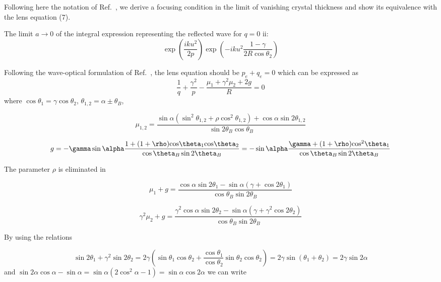\documentclass{iucr}              %
\begin{document}
Following here the notation of Ref.~\cite{GuigayFerrero2016}, we derive a focusing condition in the limit of vanishing crystal thickness and show its equivalence with the lens equation (7).

The limit   $a \to 0$ of the integral expression representing the reflected wave for  $q=0$ ii:
\begin{equation}
 \exp (\frac{{ik{u^2}}}{{2p}})\exp ( - ik{u^2}\frac{{1 - \gamma }}{{2R\cos {\theta _2}}})
\end{equation}

Following the wave-optical formulation of Ref.~\cite{GuigayFerrero2016}, the lens equation should be  $p_e + q_e = 0$  which can be expressed as
\begin{equation}
\frac{1}{q} + \frac{{{\gamma ^2}}}{p} - \frac{{{\mu _1} + {\gamma ^2}{\mu _2} + 2g}}{R} = 0
\end{equation}
where   $\cos\theta_1 = \gamma \cos\theta_2$,  $\theta_{1,2}=\alpha\pm\theta_B$,

\begin{equation}
{\mu _{1,2}} = \frac{{\sin \alpha ({{\sin }^2}{\theta _{1,2}} + \rho {{\cos }^2}{\theta _{1,2}}) + \cos \alpha \sin 2{\theta _{1,2}}}}{{\sin 2{\theta _B}\cos {\theta _B}}}
\end{equation}
 
\begin{equation}
g =  - \gamma \sin \alpha \frac{{1 + (1 + \rho ){\rm{cos}}{\theta _{\rm{1}}}{\rm{cos}}{\theta _{\rm{2}}}}}{{\cos {\theta _B}\sin 2{\theta _B}}} =  - \sin \alpha \frac{{\gamma  + (1 + \rho ){\rm{co}}{{\rm{s}}^{\rm{2}}}{\theta _{\rm{1}}}}}{{\cos {\theta _B}\sin 2{\theta _B}}}
\end{equation}
 
The parameter $\rho$ is eliminated in 
 
\begin{equation}
{\mu _1} + g = \frac{{\cos \alpha \sin 2{\theta _1} - \sin \alpha (\gamma  + \cos 2{\theta _1})}}{{\cos {\theta _B}\sin 2{\theta _B}}}
\end{equation}

\begin{equation}
{\gamma ^2}{\mu _2} + g = \frac{{{\gamma ^2}\cos \alpha \sin 2{\theta _2} - \sin \alpha (\gamma  + {\gamma ^2}\cos 2{\theta _2})}}{{\cos {\theta _B}\sin 2{\theta _B}}}
\end{equation}

By using the relations

\begin{equation}
\sin 2{\theta _1} + {\gamma ^2}\sin 2{\theta _2} = 2\gamma (\sin {\theta _1}\cos {\theta _2} + \frac{{\cos {\theta _1}}}{{\cos {\theta _2}}}\sin {\theta _2}\cos {\theta _2}) = 2\gamma \sin ({\theta _1} + {\theta _2}) = 2\gamma \sin 2\alpha 
\end{equation}
and $\sin 2\alpha \cos \alpha  - \sin \alpha  = \sin \alpha (2{\cos ^2}\alpha  - 1) = \sin \alpha \cos 2\alpha $
we can write
\end{document}

